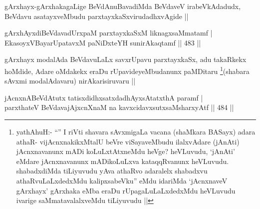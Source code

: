 \begin{artha}
gArxhayx-gArxhakagaLige BeVdAnuBavadiMda BeVdaveV irabeVkAdadudx, BeVdavu asatayxveMbudu parxtayxkaSxvirudadhxvAgide ||
\end{artha}

\begin{shl}
gArxhAyxdiBeVdavadUrxpaM parxtayxkaSxM liknagxsaMmatamf | \\
EkasoyxVBayarUpatavxM paNiDxteYH sunirAkaqtamf \hfill||  483 ||  
\end{shl}

\begin{artha}
gArxhayx modalAda BeVdavuLaLx savxrUpavu parxtayxkaSx, adu takaRkekx hoMdide, Adare oMdakekx eraDu rUpavideyeMbudanunx paMDitaru \footnote{yathAhuH:- ``\stext'' I riVti shavara sAvxmigaLa vacana (shaMkara BASayx) adara athaR- vijAcnxnakikxMtalU beVre viSayaveMbudu ilalxvAdare (jAnAti) jAcnxnavanunx mADi koLuLxtAtxneMdu heVge? heVLuvudu, `jAnAti' eMdare jAcnxnavanunx mADikoLuLxva kataqqRvanunx heVLuvudu. shabadxdiMda tiLiyuvudu yAva athaRvo adaralelx shabadxvu athaRvuLaLxdedxMdu kalipxsabeVku'' eMdu idariMda `jAcnxnaveV gArxhayx' gArxhaka eMba eraDu rUpagaLuLaLxdedxMdu heVLuvudu ivarige saMmatavalalxveMdu tiLiyuvudu ||}(shabara sAvxmi modalAdavaru) nirAkarisiruvaru ||
\end{artha}


\begin{shl}
jAcnxnABeVdAtutx tatisxdidhxsatxdadhAyxsAtatxthA paramf | \\
parxthateV BeVdavajAjxcnXnaM na kavxcidavxsutxsaMsharxyAtf \hfill||  484 ||  
\end{shl}

